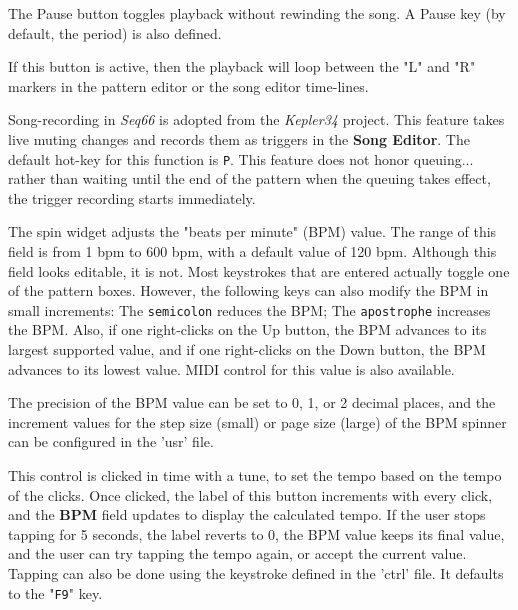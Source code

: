    The Pause button toggles playback without rewinding the song.
   A Pause key (by default, the period) is also defined.

   If this button is active, then the playback will loop
   between the "L" and "R" markers in the pattern editor or the song editor
   time-lines.

   Song-recording in \textsl{Seq66} is adopted from the
   \textsl{Kepler34} project.
   This feature takes live muting changes and records them as
   triggers in the \textbf{Song Editor}.
   The default hot-key for this function is \texttt{P}.
   This feature does not honor queuing...
   rather than waiting until the end of the pattern when the queuing takes
   effect, the trigger recording starts immediately.


   The spin widget adjusts the "beats per minute" (BPM) value.  The
   range of this field is from 1 bpm to 600 bpm, with a default value of
   120 bpm.
   Although this field looks editable, it is not.  Most keystrokes
   that are entered actually toggle one of the pattern boxes.
   However, the following keys can also modify the BPM in small increments:
   The \texttt{semicolon} reduces the BPM;
   The \texttt{apostrophe} increases the BPM.
   Also, if one right-clicks on the Up button, the BPM advances to its largest
   supported value, and if one right-clicks on the Down button, the BPM
   advances to its lowest value.
   MIDI control for this value is also available.

   The precision of the BPM value can be set to 0, 1, or 2
   decimal places, and the increment values for the step size (small)
   or page size (large) of the BPM spinner can be configured in the 'usr' file.

   This control is clicked in time with a tune, to set the
   tempo based on the tempo of the clicks.  Once clicked, the label of this
   button increments with every click, and the \textbf{BPM} field updates to
   display the calculated tempo.  If the user stops tapping for 5 seconds, the
   label reverts to 0, the BPM value keeps its final value, and the user can
   try tapping the tempo again, or accept the current value.
   Tapping can also be done using the keystroke defined
   in the 'ctrl' file.
   It defaults to the "\texttt{F9}" key.

